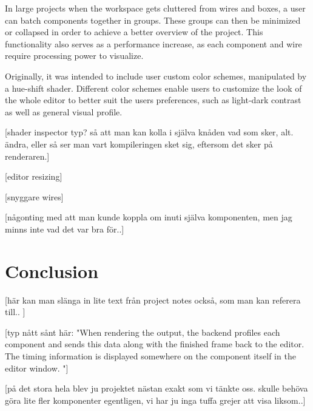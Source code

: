 In large projects when the workspace gets cluttered from wires and boxes, a user can batch components together in groups. These groups can then be minimized or collapsed in order to achieve a better overview of the project. This functionality also serves as a performance increase, as each component and wire require processing power to visualize. 

Originally, it was intended to include user custom color schemes, manipulated by a hue-shift shader. Different color schemes enable users to customize the look of the whole editor to better suit the users preferences, such as light-dark contrast as well as general visual profile.

[shader inspector typ? så att man kan kolla i själva knåden vad som sker, alt. ändra, eller så ser man vart kompileringen sket sig, eftersom det sker på renderaren.]

[editor resizing]

[snyggare wires]

[någonting med att man kunde koppla om inuti själva komponenten, men jag minns inte vad det var bra för..]

\chapter{Conclusion}

[här kan man slänga in lite text från project notes också, som man kan referera till.. ]

[typ nått sånt här: "When rendering the output, the backend profiles each component and sends this data along with the finished frame back to the editor. The timing information is displayed somewhere on the component itself in the editor window. "]

[på det stora hela blev ju projektet nästan exakt som vi tänkte oss. skulle behöva göra lite fler komponenter egentligen, vi har ju inga tuffa grejer att visa liksom..]